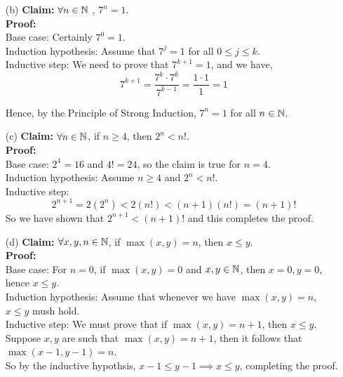 \documentclass[11pt]{article}
\newif\ifsolutions
\begin{document}
\begin{qunlist}
\begin{itemize}
\ifsolutions
\textbf{Solutions:}
\fi


\item[(b)]\textbf{Claim:} $\forall n \in \mathbb{N}$ , $7^n = 1$. \\
\textbf{Proof:} \\
Base case: Certainly $7^0 = 1$. \\
Induction hypothesis: Assume that $7^j = 1$ for all $0\leq j \leq k$.\\
Inductive step: We need to prove that $7^{k+1} = 1$, and we have,
\[ 7^{k+1} = \frac{7^k \cdot 7^k}{7^{k-1}} = \frac{1 \cdot 1}{1} = 1\]

Hence, by the Principle of Strong Induction, $7^n = 1$ for all $n \in \mathbb{N}$.

\ifsolutions
\textbf{Solutions:}
\fi


\item[(c)]\textbf{Claim:} $\forall n \in \mathbb{N}$, if $n \geq 4$, then $2^n < n!$. \\
\textbf{Proof:} \\
Base case: $2^4 = 16$ and $4! = 24$, so the claim is true for $n=4$. \\
Induction hypothesis: Assume $n \geq 4$ and $2^n < n!$. \\
Inductive step: \[ 2^{n+1} = 2(2^n) < 2(n!) < (n+1)(n!) = (n+1)!\]
So we have shown that $2^{n+1} < (n+1)!$ and this completes the proof.

\ifsolutions
\textbf{Solutions:} This proof is correct.
\fi


\item[(d)]\textbf{Claim:} $\forall x,y,n \in \mathbb{N}$, if $\max(x,y) = n$, then $x \leq y$. \\
\textbf{Proof:} \\
Base case: For $n=0$, if $\max(x,y) = 0$ and $x,y \in \mathbb{N}$, then $x=0, y=0$, hence $x \leq y$. \\
Induction hypothesis: Assume that whenever we have $\max(x,y) = n$, $x \leq y$ mush hold. \\
Inductive step: We must prove that if $\max(x,y) = n+1$, then $x \leq y$. \\
Suppose $x,y$ are such that $\max(x,y) = n+1$, then it follows that $\max(x-1,y-1) = n$. \\
So by the inductive hypothsis, $x-1 \leq y-1  \implies x \leq y$, completing the proof.

\ifsolutions
\textbf{Solutions:}
\fi


\end{itemize}





\end{qunlist}
\end{document}
